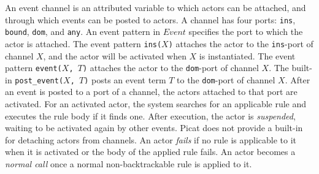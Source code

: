 An event channel is an attributed variable to which actors can be attached, and through which events can be posted to actors. A channel has four ports: \texttt{ins}, \texttt{bound}, \texttt{dom}, and \texttt{any}. An event pattern in $Event$ specifies the port to which the actor is attached. The event pattern \texttt{ins($X$)} attaches the actor to the \texttt{ins}-port of channel $X$, and the actor will be activated when $X$ is instantiated. The event pattern \texttt{event($X$, $T$)} attaches the actor to the \texttt{dom}-port of channel $X$. The built-in \texttt{post\_event($X$, $T$)} posts an event term \texttt{$T$} to the \texttt{dom}-port of channel $X$. After an event is posted to a port of a channel, the actors attached to that port are activated. For an activated actor, the system searches for an applicable rule and executes the rule body if it finds one. After execution, the actor is \emph{suspended}, waiting to be activated again by other events. Picat does not provide a built-in for detaching actors from channels. An actor \emph{fails} if no rule is applicable to it when it is activated or the body of the applied rule fails. An actor becomes a \emph{normal call} once a normal non-backtrackable rule is applied to it.

